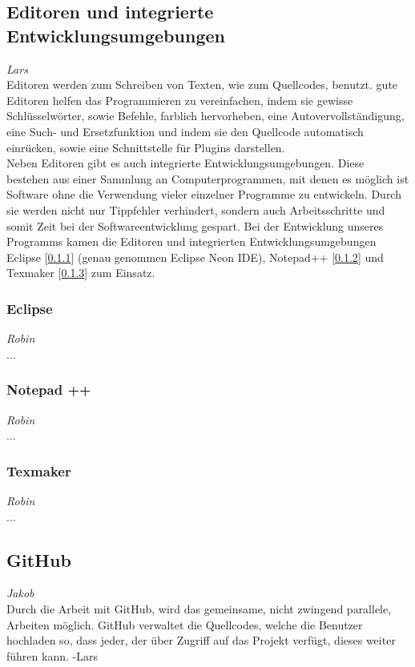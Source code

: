 \documentclass[12pt,a4paper,bibliography=totocnumbered,listof=totocnumbered]{scrartcl}
\begin{document}
\subsection{Editoren und integrierte Entwicklungsumgebungen}
\label{sec:Editoren}
\emph{Lars}\\
Editoren werden zum Schreiben von Texten, wie zum Quellcodes, benutzt. gute Editoren helfen das Programmieren zu vereinfachen, indem sie gewisse Schlüsselwörter, sowie Befehle, farblich hervorheben, eine Autovervollständigung, eine Such- und Ersetzfunktion und indem sie den Quellcode automatisch einrücken, sowie eine Schnittstelle für Plugins darstellen.\cite{Texteditor} \\
Neben Editoren gibt es auch integrierte Entwicklungsumgebungen. Diese bestehen aus einer Sammlung an Computerprogrammen, mit denen es möglich ist Software ohne die Verwendung vieler einzelner Programme zu entwickeln. Durch sie werden nicht nur Tippfehler verhindert, sondern auch Arbeitsschritte und somit Zeit bei der Softwareentwicklung gespart.\cite{Integrierte_Entwicklungsumgebung}\cite{Medienbruch}
Bei der Entwicklung unseres Programms kamen die Editoren und integrierten Entwicklungsumgebungen Eclipse [\ref{sec:Eclipse}] (genau genommen Eclipse Neon IDE), Notepad++ [\ref{sec:Notepad++}] und Texmaker [\ref{sec:Texmaker}] zum Einsatz.

\subsubsection{Eclipse}
\label{sec:Eclipse}
\emph{Robin}\\
...

\subsubsection{Notepad ++}
\label{sec:Notepad++}
\emph{Robin}\\
...

\subsubsection{Texmaker}
\label{sec:Texmaker}
\emph{Robin}\\
...

\subsection{GitHub}
\label{sec:GitHub}
\emph{Jakob}\\
Durch die Arbeit mit GitHub, wird das gemeinsame, nicht zwingend parallele, Arbeiten möglich. GitHub verwaltet die Quellcodes, welche die Benutzer hochladen so, dass jeder, der über Zugriff auf das Projekt verfügt, dieses weiter führen kann. -Lars
\end{document}

